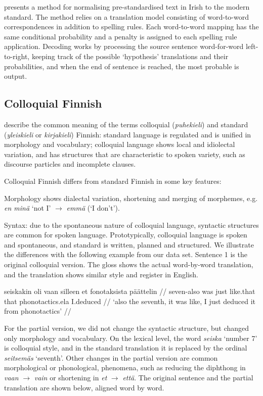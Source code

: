 \documentclass[11pt]{article}
\begin{document}
 presents a method for normalising pre-standardised text in Irish to 
the modern standard. The method relies on a translation model consisting of word-to-word 
correspondences in addition to spelling rules. Each word-to-word mapping has the same
conditional probability and a penalty is assigned to each spelling rule application. Decoding
works by processing the source sentence word-for-word left-to-right, keeping track of the 
possible `hypothesis' translations and their probabilities, and when the end of 
sentence is reached, the most probable is output.

\subsection{Colloquial Finnish}


 describe the common meaning of the terms colloquial (\emph{puhekieli}) and standard (\emph{yleiskieli} or \emph{kirjakieli}) Finnish: standard language is regulated and is unified in morphology and vocabulary; colloquial language shows local and idiolectal variation, and has structures that are characteristic to spoken variety,  such as discourse particles and incomplete clauses.



Colloquial Finnish differs from standard Finnish in some key features: 

Morphology shows dialectal variation, shortening and merging of morphemes, e.g. \emph{en min\"{a}} `not I' $\rightarrow$ \emph{emm\"{a}} (`I don't').

Syntax: due to the spontaneous nature of colloquial language, syntactic structures are common for spoken language. 
Prototypically, colloquial language is spoken and spontaneous, and standard is written, planned and structured. We illustrate the differences with the following example from our data set. Sentence 1 is the original colloquial version. The gloss shows the actual word-by-word translation, and the translation shows similar style and register in English.

\ex
\begingl
\gla seiskakin oli vaan silleen et fonotaksista p\"{a}\"{a}ttelin //
\glb seven-{\sc also} was just like.that that phonotactics.{\sc ela} I.deduced //
\glft `also the seventh, it was like, I just deduced it from phonotactics' //
\endgl
\xe


For the partial version, we did not change the syntactic structure, but changed only morphology and vocabulary. On the lexical level, the word \emph{seiska} `number 7' is colloquial style, and in the standard translation it is replaced by the ordinal \emph{seitsem\"{a}s} `seventh'.  Other changes in the partial version are common morphological or phonological, phenomena, such as reducing the diphthong in \emph{vaan} $\rightarrow$ \emph{vain} or shortening in  \emph{et} $\rightarrow$ \emph{että}. The original sentence and the partial translation are shown below, aligned word by word.
\end{document}
